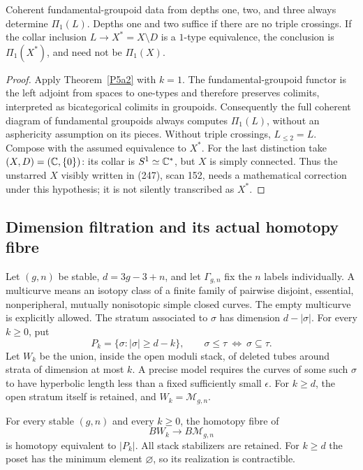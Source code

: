 \begin{corollary}\label{P5a3}
Coherent fundamental-groupoid data from depths one, two, and three
always determine \(\Pi_1(L)\). Depths one and two suffice if there
are no triple crossings. If the collar inclusion
\(L\to X^*=X\setminus D\) is a \(1\)-type equivalence, the conclusion
is \(\Pi_1(X^*)\), and need not be \(\Pi_1(X)\).
\end{corollary}

\begin{proof}
Apply Theorem~\ref{P5a2} with \(k=1\). The fundamental-groupoid
functor is the left adjoint from spaces to one-types and therefore
preserves colimits, interpreted as bicategorical colimits in groupoids.
Consequently the full coherent diagram of fundamental groupoids always
computes \(\Pi_1(L)\), without an asphericity assumption on its pieces.
Without triple crossings, \(L_{\leq2}=L\). Compose with the assumed
equivalence to \(X^*\).
For the last distinction take \((X,D)=(\mathbb C,\{0\})\): its collar is
\(S^1\simeq\mathbb C^*\), but \(X\) is simply connected. Thus the unstarred
\(X\) visibly written in (247), scan 152, needs a mathematical
correction under this hypothesis; it is not silently transcribed
as \(X^*\).
\end{proof}

\subsection{Dimension filtration and its actual homotopy fibre}

Let \((g,n)\) be stable, \(d=3g-3+n\), and let \(\Gamma_{g,n}\)
fix the \(n\) labels individually. A multicurve means an isotopy
class of a finite family of pairwise disjoint, essential,
nonperipheral, mutually nonisotopic simple closed curves.
The empty multicurve is explicitly allowed. The stratum associated
to \(\sigma\) has dimension \(d-|\sigma|\). For every \(k\geq0\), put
\[
 P_k=\{\sigma:|\sigma|\geq d-k\},\qquad
 \sigma\leq\tau\ \Longleftrightarrow\ \sigma\subseteq\tau .
\]
Let \(W_k\) be the union, inside the open moduli stack, of deleted
tubes around strata of dimension at most \(k\). A precise model
requires the curves of some such \(\sigma\) to have hyperbolic
length less than a fixed sufficiently small \(\epsilon\).
For \(k\geq d\), the open stratum itself is retained, and
\(W_k=\mathcal M_{g,n}\).

\begin{theorem}\label{P5b1}
For every stable \((g,n)\) and every \(k\geq0\), the homotopy fibre of
\[
                          BW_k\longrightarrow B\mathcal M_{g,n}
\]
is homotopy equivalent to \(|P_k|\). All stack stabilizers are retained.
For \(k\geq d\) the poset has the minimum element \(\varnothing\),
so its realization is contractible.
\end{theorem}

